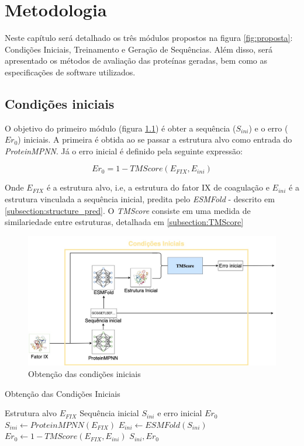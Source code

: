 \chapter{Metodologia}
Neste capítulo será detalhado os três módulos propostos na figura \ref{fig:proposta}: 
Condições Iniciais, Treinamento e Geração de Sequências. 
Além disso, será apresentado os métodos de avaliação das proteínas geradas,
bem como as especificações de software utilizados. 


\section{Condições iniciais}
O objetivo do primeiro módulo (figura \ref{fig:cond_iniciais}) é obter a sequência ($S_{ini}$) e o erro ($Er_{0}$) iniciais. 
A primeira é obtida ao se passar a estrutura alvo como entrada do \textit{ProteinMPNN}.
Já o erro inicial é definido pela seguinte expressão:
 
\begin{equation}
    Er_{0} = 1 - TMScore(E_{FIX}, E_{ini})
\end{equation}

\noindent
Onde $E_{FIX}$ é a estrutura alvo, i.e, a estrutura do fator IX de coagulação e $E_{ini}$ é a estrutura vinculada a sequência inicial, 
predita pelo \textit{ESMFold} - descrito em \ref{subsection:structure_pred}. 
O \textit{TMScore} consiste em uma medida de similariedade entre estruturas, detalhada em \ref{subsection:TMScore}

\begin{figure}[H]
  \centering
  \includegraphics[width=.8\textwidth]{figuras/metodologia-Initial_cond.jpg}
  \caption{Obtenção das condições iniciais}
  \label{fig:cond_iniciais}
\end{figure}

\begin{algorithm}
  \caption{Obtenção das Condições Iniciais}
  \label{alg:initial_conditions}
  \begin{algorithmic}[1]
  \Require Estrutura alvo $E_{FIX}$
  \Ensure Sequência inicial $S_{ini}$ e erro inicial $Er_{0}$
  \State $S_{ini} \gets \textit{ProteinMPNN}(E_{FIX})$
  \State $E_{ini} \gets \textit{ESMFold}(S_{ini})$
  \State $Er_{0} \gets 1 - \textit{TMScore}(E_{FIX}, E_{ini})$
  \State \Return $S_{ini}, Er_{0}$
  \end{algorithmic}
  \end{algorithm}

